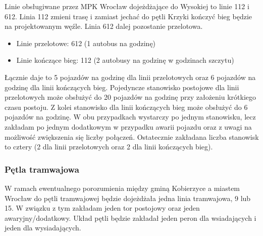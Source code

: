 \documentclass[twoside,12pt]{article}
\begin{document}
	Linie obsługiwane przez MPK Wrocław dojeżdżające do Wysokiej to linie 112 i 612. Linia 112 zmieni trasę i zamiast jechać do pętli Krzyki kończyć bieg będzie na projektowanym węźle. Linia 612 dalej pozostanie przelotowa.
	\begin{itemize}
	\item Linie przelotowe: 612 (1 autobus na godzinę)
	\item Linie kończące bieg: 112 (2 autobusy na godzinę w godzinach szczytu)
	\end{itemize}
	
	Łącznie daje to 5 pojazdów na godzinę dla linii przelotowych oraz 6 pojazdów na godzinę dla linii kończących bieg. Pojedyncze stanowisko postojowe dla linii przelotowych może obsłużyć do 20 pojazdów na godzinę przy założeniu krótkiego czasu postoju. Z kolei stanowisko dla linii kończących bieg może obsłużyć do 6 pojazdów na godzinę. W obu przypadkach wystarczy po jednym stanowisku, lecz zakładam po jednym dodatkowym w przypadku awarii pojazdu oraz z uwagi na możliwość zwiększenia się liczby połączeń. Ostatecznie zakładana liczba stanowisk to cztery (2 dla linii przelotowych oraz 2 dla linii kończących bieg).
	
	\subsubsection{Pętla tramwajowa}
	
	W ramach ewentualnego porozumienia między gminą Kobierzyce a miastem Wrocław do pętli tramwajowej będzie dojeżdżała jedna linia tramwajowa, 9 lub 15. W związku z tym zakładam jeden tor postojowy oraz jeden awaryjny/dodatkowy. Układ pętli będzie zakładał jeden peron dla wsiadających i jeden dla wysiadających. 

\clearpage
\small

\end{document}
